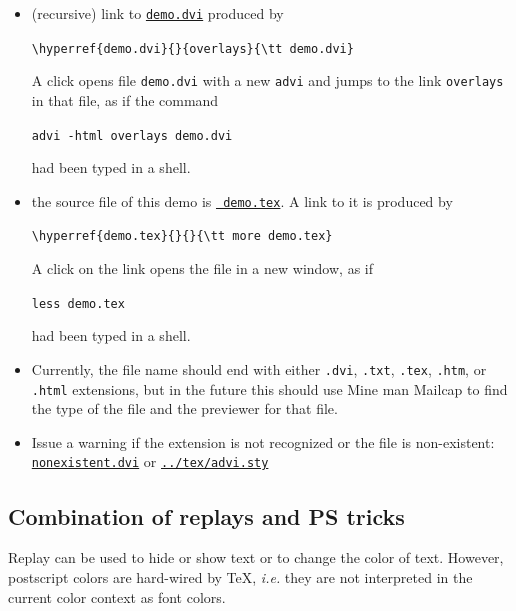 \documentclass[12pt]{article}
\begin{document}
\begin {itemize}

\item (recursive) link to \hyperref{demo.dvi}{}{overlays}{\tt demo.dvi}
produced by

\qquad\verb"\hyperref{demo.dvi}{}{overlays}{\tt demo.dvi}"

A click opens file \verb"demo.dvi" with a new \verb"advi" and jumps to the
link \verb"overlays" in that file, as if the command

\qquad\verb"advi -html overlays demo.dvi"

had been typed in a shell.

\item the source file of this demo is \hyperref{demo.tex}{}{}{\tt
demo.tex}. A link to it is produced by

\qquad\verb"\hyperref{demo.tex}{}{}{\tt more demo.tex}"

A click on the link opens the file in a new window, as if 

\qquad\verb"less demo.tex"

had been typed in a shell.

\item Currently, the file name should end with either \verb".dvi",
\verb".txt", \verb".tex", \verb".htm", or \verb".html" extensions, but
in the future this should use Mine man Mailcap to find the type of the
file and the previewer for that file.

\item Issue a warning if the extension is not recognized or the file
is non-existent:
\hyperref{nonexistent.dvi}{}{}{\tt nonexistent.dvi}
or
\hyperref{../tex/advi.sty}{}{}{\tt ../tex/advi.sty}

\end {itemize}

\newpage

\subsection* {Combination of replays and PS tricks}

Replay can be used to hide or show text or to change the color of text. 
However, postscript colors are hard-wired by {\TeX}, {\em i.e.} they are not
interpreted in the current color context as font colors. 
\end{document}
